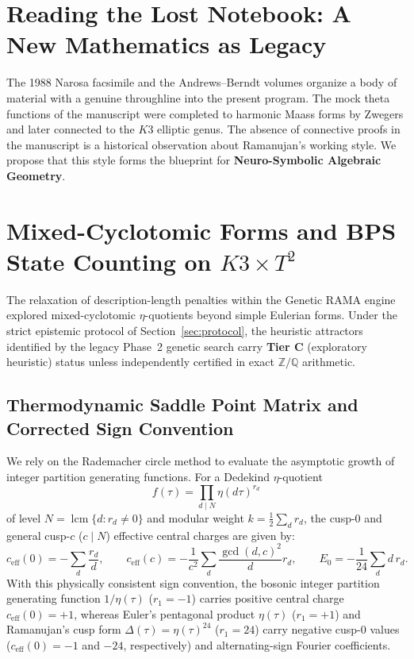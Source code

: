\documentclass[11pt,a4paper]{article}
\theoremstyle{plain}
\theoremstyle{definition}
\theoremstyle{remark}
\newcommand{\tierC}{\textbf{Tier C}}
\begin{document}
\section{Reading the Lost Notebook: A New Mathematics as Legacy}
\label{sec:lostnotebook}
The 1988 Narosa facsimile and the Andrews--Berndt volumes organize a body of material with a genuine throughline into the present program. The mock theta functions of the manuscript were completed to harmonic Maass forms by Zwegers and later connected to the $K3$ elliptic genus. The absence of connective proofs in the manuscript is a historical observation about Ramanujan's working style. We propose that this style forms the blueprint for \textbf{Neuro-Symbolic Algebraic Geometry}.

\section{Mixed-Cyclotomic Forms and BPS State Counting on $K3 \times T^2$}

The relaxation of description-length penalties within the Genetic RAMA engine explored mixed-cyclotomic $\eta$-quotients beyond simple Eulerian forms. Under the strict epistemic protocol of Section~\ref{sec:protocol}, the heuristic attractors identified by the legacy Phase~2 genetic search carry \tierC{} (exploratory heuristic) status unless independently certified in exact $\mathbb{Z}/\mathbb{Q}$ arithmetic.

\subsection{Thermodynamic Saddle Point Matrix and Corrected Sign Convention}
We rely on the Rademacher circle method to evaluate the asymptotic growth of integer partition generating functions. For a Dedekind $\eta$-quotient
\begin{equation}
f(\tau) = \prod_{d \mid N} \eta(d\tau)^{r_d}
\end{equation}
of level $N = \operatorname{lcm}\{d : r_d \neq 0\}$ and modular weight $k = \frac{1}{2}\sum_d r_d$, the cusp-$0$ and general cusp-$c$ ($c \mid N$) effective central charges are given by:
\begin{equation}
c_{\text{eff}}(0) = -\sum_{d} \frac{r_d}{d}, \qquad
c_{\text{eff}}(c) = -\frac{1}{c^2} \sum_{d} \frac{\gcd(d, c)^2}{d} r_d, \qquad
E_0 = -\frac{1}{24} \sum_{d} d\, r_d.
\end{equation}
With this physically consistent sign convention, the bosonic integer partition generating function $1/\eta(\tau)$ ($r_1 = -1$) carries positive central charge $c_{\text{eff}}(0) = +1$, whereas Euler's pentagonal product $\eta(\tau)$ ($r_1 = +1$) and Ramanujan's cusp form $\Delta(\tau) = \eta(\tau)^{24}$ ($r_1 = 24$) carry negative cusp-$0$ values ($c_{\text{eff}}(0) = -1$ and $-24$, respectively) and alternating-sign Fourier coefficients.
\end{document}
